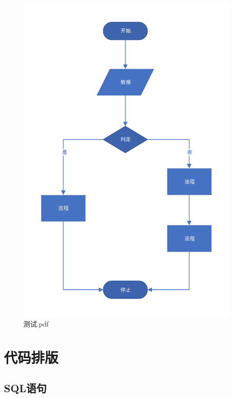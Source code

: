 \documentclass[UTF8]{ctexart}
\numberwithin{figure}{section}
\begin{document}
\begin{figure}[H]
\begin{minipage}[c]{0.5\textwidth}
		\includegraphics[width=1\textwidth]{测试.pdf}
		\caption{测试.pdf}
	\end{minipage}
\end{figure}


\section{代码排版}
\subsection{SQL语句}
\end{document}

